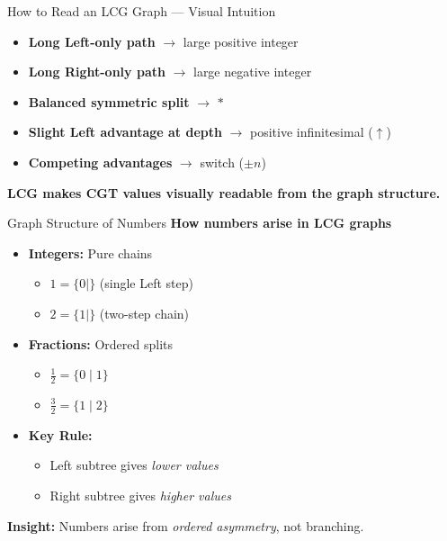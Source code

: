 \documentclass[10pt,aspectratio=169]{beamer}
\begin{document}
\begin{frame}{How to Read an LCG Graph — Visual Intuition}
  \begin{itemize}
    \item \textbf{Long Left-only path} $\to$ large positive integer
    \item \textbf{Long Right-only path} $\to$ large negative integer
    \item \textbf{Balanced symmetric split} $\to$ $*$
    \item \textbf{Slight Left advantage at depth} $\to$ positive infinitesimal ($\uparrow$)
    \item \textbf{Competing advantages} $\to$ switch ($\pm n$)
  \end{itemize}

  \vspace{15pt}
  \centering
  \textbf{LCG makes CGT values visually readable from the graph structure.}
\end{frame}


\begin{frame}{Graph Structure of Numbers}
\textbf{How numbers arise in LCG graphs}

\vspace{5pt}

\begin{itemize}
  \item \textbf{Integers:} Pure chains
  \begin{itemize}
    \item $1 = \{0 \mid\}$ (single Left step)
    \item $2 = \{1 \mid\}$ (two-step chain)
  \end{itemize}

  \vspace{5pt}

  \item \textbf{Fractions:} Ordered splits
  \begin{itemize}
    \item $\frac{1}{2} = \{0 \mid 1\}$
    \item $\frac{3}{2} = \{1 \mid 2\}$
  \end{itemize}

  \vspace{5pt}

  \item \textbf{Key Rule:}
  \begin{itemize}
    \item Left subtree gives \emph{lower values}
    \item Right subtree gives \emph{higher values}
  \end{itemize}
\end{itemize}

\vspace{10pt}
\textbf{Insight:} Numbers arise from \emph{ordered asymmetry}, not branching.
\end{frame}
\end{document}
